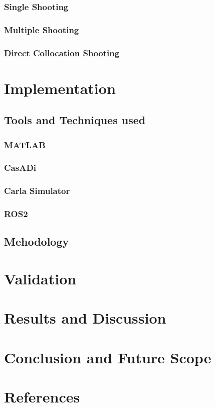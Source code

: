 \documentclass{article}
\begin{document}
\begin{titlepage}
    \subsubsection{Single Shooting}
    \subsubsection{Multiple Shooting}
    \subsubsection{Direct Collocation Shooting}

    \section{Implementation}
    \subsection{Tools and Techniques used}
    \subsubsection{MATLAB}
    \subsubsection{CasADi}
    \subsubsection{Carla Simulator}
    \subsubsection{ROS2}
    \subsection{Mehodology}

    \section{Validation}

    \section{Results and Discussion}

    \section{Conclusion and Future Scope}

    \section{References}


\end{titlepage}
\end{document}
